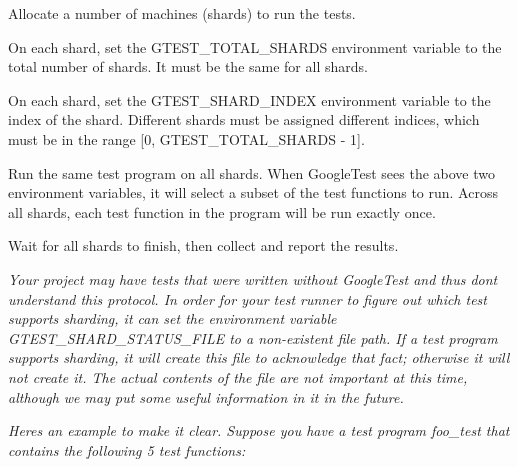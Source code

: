 {\itshape 
\begin{DoxyEnumerate}
\item Allocate a number of machines (shards) to run the tests.
\end{DoxyEnumerate}
\begin{DoxyEnumerate}
\item On each shard, set the {\ttfamily G\+T\+E\+S\+T\+\_\+\+T\+O\+T\+A\+L\+\_\+\+S\+H\+A\+R\+DS} environment variable to the total number of shards. It must be the same for all shards.
\end{DoxyEnumerate}
\begin{DoxyEnumerate}
\item On each shard, set the {\ttfamily G\+T\+E\+S\+T\+\_\+\+S\+H\+A\+R\+D\+\_\+\+I\+N\+D\+EX} environment variable to the index of the shard. Different shards must be assigned different indices, which must be in the range {\ttfamily \mbox{[}0, G\+T\+E\+S\+T\+\_\+\+T\+O\+T\+A\+L\+\_\+\+S\+H\+A\+R\+DS -\/ 1\mbox{]}}.
\end{DoxyEnumerate}
\begin{DoxyEnumerate}
\item Run the same test program on all shards. When Google\+Test sees the above two environment variables, it will select a subset of the test functions to run. Across all shards, each test function in the program will be run exactly once.
\end{DoxyEnumerate}
\begin{DoxyEnumerate}
\item Wait for all shards to finish, then collect and report the results.
\end{DoxyEnumerate}}

{\itshape Your project may have tests that were written without Google\+Test and thus don\textquotesingle{}t understand this protocol. In order for your test runner to figure out which test supports sharding, it can set the environment variable {\ttfamily G\+T\+E\+S\+T\+\_\+\+S\+H\+A\+R\+D\+\_\+\+S\+T\+A\+T\+U\+S\+\_\+\+F\+I\+LE} to a non-\/existent file path. If a test program supports sharding, it will create this file to acknowledge that fact; otherwise it will not create it. The actual contents of the file are not important at this time, although we may put some useful information in it in the future.}

{\itshape Here\textquotesingle{}s an example to make it clear. Suppose you have a test program {\ttfamily foo\+\_\+test} that contains the following 5 test functions\+:}

